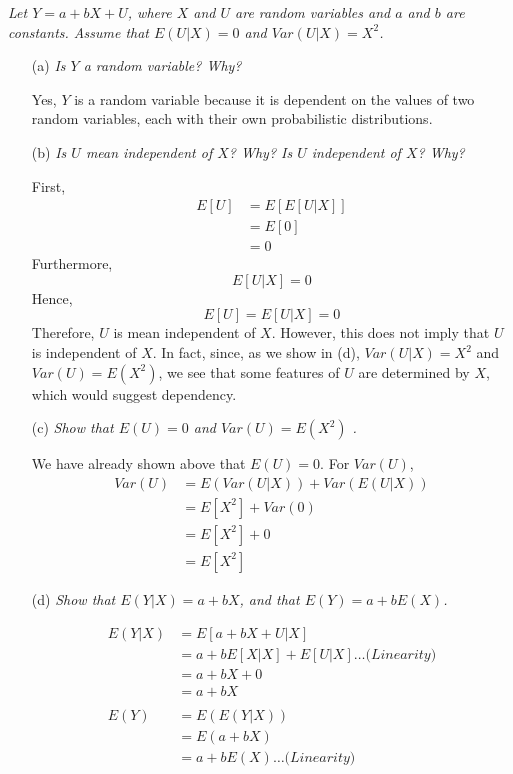 \documentclass[
]{article}
\begin{document}
\textit{Let $Y = a + bX + U$, where $X$ and $U$ are random variables and $a$ and $b$ are constants. Assume that $E(U|X)=0$ and $Var(U|X)=X^2$.}

\begin{enumerate}
\item[(a)] \textit{Is $Y$ a random variable? Why?}  
  
Yes, $Y$ is a random variable because it is dependent on the values of two random variables, each with their own probabilistic distributions. 

\item[(b)] \textit{Is $U$ mean independent of $X$? Why? Is $U$ independent of $X$? Why?}  
  
First, 
\[\begin{aligned} 
E[U] &= E[E[U|X]] \\
&= E[0] \\
&= 0
\end{aligned}\]
Furthermore, 
$$E[U|X] = 0$$
Hence, 
$$E[U] = E[U|X] =0$$
Therefore, $U$ is mean independent of $X$. However, this does not imply that $U$ is independent of $X$. In fact, since, as we show in (d), $Var(U|X) = X^2$ and $Var(U) = E(X^2)$, we see that some features of $U$ are determined by $X$, which would suggest dependency. 

\item[(c)] \textit{Show that $E(U)=0$ and $Var(U)=E(X^2)$ .}
  
We have already shown above that $E(U) = 0$.  
For $Var(U)$, 
\[\begin{aligned}
Var(U) &= E(Var(U|X))+Var(E(U|X)) \\
&= E[X^2] + Var(0) \\
&= E[X^2] + 0 \\
&= E[X^2]
\end{aligned}\]  
  
\item[(d)] \textit{Show that $ E (Y|X) = a + bX$, and that $E (Y) = a + bE (X)$.}  
  
\[\begin{aligned}
E(Y|X) &= E[a + bX + U | X] \\
&= a + bE[X|X] + E[U|X] \dots \textit{(Linearity)} \\
&= a + bX + 0 \\
&= a + bX \\
\\
E(Y) &= E(E(Y|X)) \\
&= E(a + bX) \\
&= a + bE(X) \dots \textit{(Linearity)}
\end{aligned}\] 
  

\end{enumerate}
\end{document}
